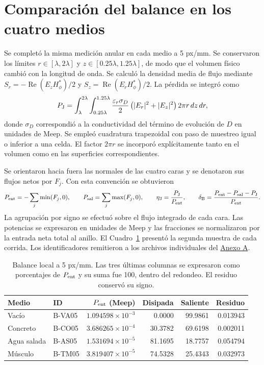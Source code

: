 \section{Comparación del balance en los cuatro medios}\label{sec:balance-comparativo}
Se completó la misma medición anular en cada medio a 5 px/mm. Se conservaron los límites $r\in[\lambda,2\lambda]$ y $z\in[0.25\lambda,1.25\lambda]$, de modo que el volumen físico cambió con la longitud de onda. Se calculó la densidad media de flujo mediante $S_r=-\operatorname{Re}(E_zH_\phi^*)/2$ y $S_z=\operatorname{Re}(E_rH_\phi^*)/2$. La pérdida se integró como
\begin{equation}
 P_{\rm J}=\int_{\lambda}^{2\lambda}\int_{0.25\lambda}^{1.25\lambda}
 \frac{\varepsilon_r\sigma_D}{2}\left(|E_r|^2+|E_z|^2\right)2\pi r\, dz\,dr,
 \label{eq:joule-anular}
\end{equation}
donde $\sigma_D$ correspondió a la conductividad del término de evolución de $D$ en unidades de Meep. Se empleó cuadratura trapezoidal con paso de muestreo igual o inferior a una celda. El factor $2\pi r$ se incorporó explícitamente tanto en el volumen como en las superficies correspondientes.

Se orientaron hacia fuera las normales de las cuatro caras y se denotaron sus flujos netos por $F_j$. Con esta convención se obtuvieron
\begin{equation}
 P_{\rm ent}=-\sum_j\min(F_j,0),\qquad
 P_{\rm sal}=\sum_j\max(F_j,0),\qquad
 \eta_{\rm J}=\frac{P_{\rm J}}{P_{\rm ent}},\qquad
 \delta_{\rm B}=\frac{P_{\rm ent}-P_{\rm sal}-P_{\rm J}}{P_{\rm ent}}.
 \label{eq:balance-normalizado}
\end{equation}
La agrupación por signo se efectuó sobre el flujo integrado de cada cara. Las potencias se expresaron en unidades de Meep y las fracciones se normalizaron por la entrada neta total al anillo. El Cuadro~\ref{tab:balance-medios} presentó la segunda muestra de cada corrida. Los identificadores remitieron a los archivos individuales del \hyperref[an:balance-registros]{Anexo A}.

\begin{table}[htbp]\centering\small
\caption{Balance local a 5 px/mm. Las tres últimas columnas se expresaron como porcentajes de $P_{\rm ent}$ y su suma fue 100, dentro del redondeo. El residuo conservó su signo.}\label{tab:balance-medios}
\begin{tabular}{llrrrr}\hline
Medio & ID & $P_{\rm ent}$ (Meep) & Disipada & Saliente & Residuo \\ \hline
Vacío & B-VA05 & $1.094598\!\times\!10^{-3}$ & 0.0000 & 99.9861 & 0.013943 \\
Concreto & B-CO05 & $3.686265\!\times\!10^{-4}$ & 30.3782 & 69.6198 & 0.002011 \\
Agua salada & B-AS05 & $1.531694\!\times\!10^{-5}$ & 81.1695 & 18.7757 & 0.054794 \\
Músculo & B-TM05 & $3.819407\!\times\!10^{-5}$ & 74.5328 & 25.4343 & 0.032973 \\ \hline
\end{tabular}\end{table}

